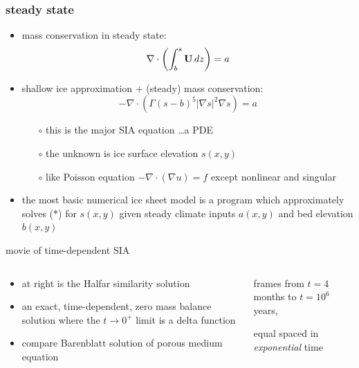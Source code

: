 \documentclass[hide notes,intlimits]{beamer}
\newcommand{\Div}{\nabla\cdot}
\begin{document}
\begin{frame}
  \frametitle{steady state}

\begin{itemize}
\item mass conservation in steady state: 
  $$\Div \left(  \int_b^s {\bf U}\, dz \right)  =  a$$
\item shallow ice approximation + (steady) mass conservation:
\begin{equation}
- \Div \left(\Gamma (s-b)^5 | \nabla s |^2 \nabla s  \right) =  a  \tag{$\ast$}
\end{equation}
  \begin{itemize}
  \vspace{-0.2in}
  \item[$\circ$] this is the major SIA equation \dots a PDE
  \item[$\circ$] the unknown is ice surface elevation $s(x,y)$
  \item[$\circ$] like Poisson equation $-\Div (\nabla u) = f$ except nonlinear and singular
  \end{itemize}
\item the most basic numerical ice sheet model is a program which approximately solves ($\ast$) for $s(x,y)$ given steady climate inputs $a(x,y)$ and bed elevation $b(x,y)$
\end{itemize}
\end{frame}


\begin{frame}{movie of time-dependent SIA}

\begin{columns}
\begin{column}{0.4\textwidth}
\small
\begin{itemize}
\item at right is the Halfar similarity solution
\item an exact, time-dependent, zero mass balance solution where the $t\to 0^+$ limit is a delta function
\item compare Barenblatt solution of porous medium equation
\end{itemize}
\end{column}

\begin{column}{0.65\textwidth}
\vspace{-0.25in}

\begin{center}

\bigskip
\tiny
frames from $t=4$ months to $t = 10^6$ years,

equal spaced in \emph{exponential} time
\end{center}
\end{column}
\end{columns}
\end{frame}
\end{document}
